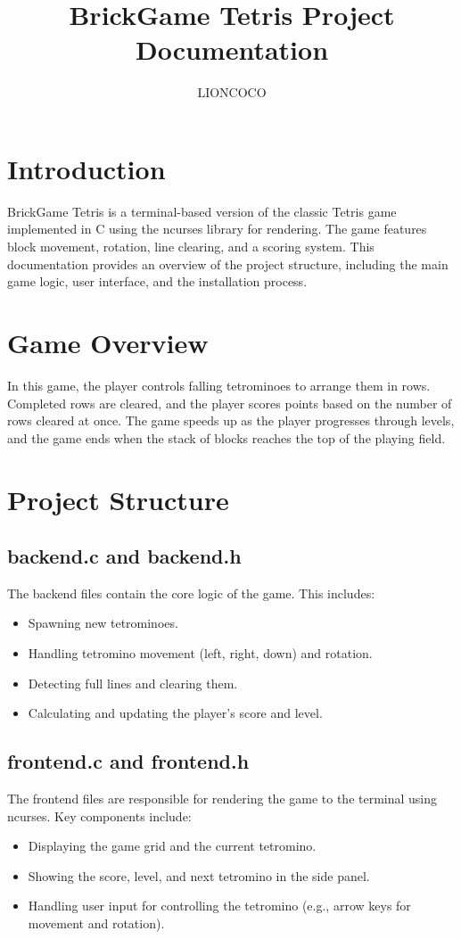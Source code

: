 \documentclass{article}
\title{BrickGame Tetris Project Documentation}
\author{LIONCOCO}
\begin{document}
\maketitle

\tableofcontents

\section{Introduction}
BrickGame Tetris is a terminal-based version of the classic Tetris game implemented in C using the ncurses library for rendering. The game features block movement, rotation, line clearing, and a scoring system. This documentation provides an overview of the project structure, including the main game logic, user interface, and the installation process.

\section{Game Overview}
In this game, the player controls falling tetrominoes to arrange them in rows. Completed rows are cleared, and the player scores points based on the number of rows cleared at once. The game speeds up as the player progresses through levels, and the game ends when the stack of blocks reaches the top of the playing field.

\section{Project Structure}

\subsection{backend.c and backend.h}
The backend files contain the core logic of the game. This includes:
\begin{itemize}
    \item Spawning new tetrominoes.
    \item Handling tetromino movement (left, right, down) and rotation.
    \item Detecting full lines and clearing them.
    \item Calculating and updating the player's score and level.
\end{itemize}

\subsection{frontend.c and frontend.h}
The frontend files are responsible for rendering the game to the terminal using ncurses. Key components include:
\begin{itemize}
    \item Displaying the game grid and the current tetromino.
    \item Showing the score, level, and next tetromino in the side panel.
    \item Handling user input for controlling the tetromino (e.g., arrow keys for movement and rotation).
\end{itemize}
\end{document}
